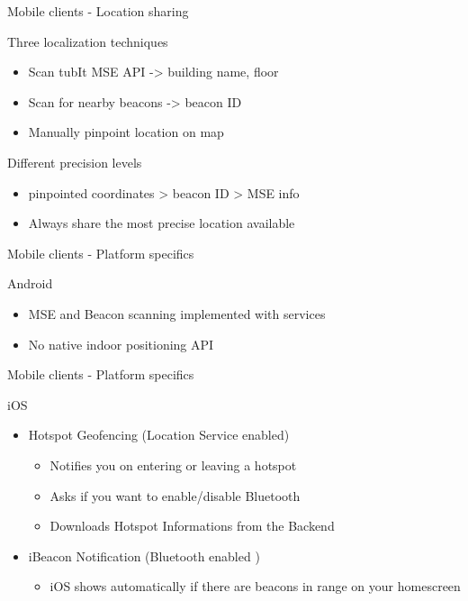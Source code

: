 \documentclass[11pt]{beamer}
\begin{document}
\begin{frame}{Mobile clients - Location sharing}

  Three localization techniques\\[1em]
  \begin{itemize}
    \item Scan tubIt MSE API -> building name, floor
    \item Scan for nearby beacons -> beacon ID
    \item Manually pinpoint location on map
  \end{itemize}
  \bigskip
  \pause
  Different precision levels\\[1em]
  \begin{itemize}
    \item pinpointed coordinates > beacon ID > MSE info
    \item Always share the most precise location available
  \end{itemize}

\end{frame}


\begin{frame}{Mobile clients - Platform specifics}

  Android

  \begin{itemize}

    \item MSE and Beacon scanning implemented with services
    \item No native indoor positioning API

  \end{itemize}

\end{frame}


\begin{frame}{Mobile clients - Platform specifics}

  iOS

  \begin{itemize}

    \item Hotspot Geofencing (Location Service enabled)\\[1em]
    \begin{itemize}
         \item Notifies you on entering or leaving a hotspot
         \item Asks if you want to enable/disable Bluetooth
         \item Downloads Hotspot Informations from the Backend
     \end{itemize}
     \pause
    \item iBeacon Notification (Bluetooth enabled )\\[1em]
    \begin{itemize}
         \item iOS shows automatically if there are beacons in range on your homescreen

     \end{itemize}

  \end{itemize}

\end{frame}
\end{document}
